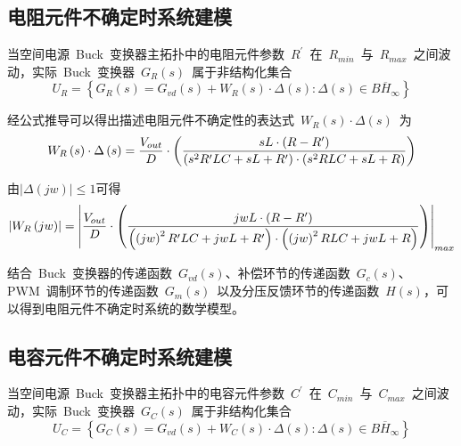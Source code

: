 \subsection{电阻元件不确定时系统建模}
\label{sub:chap5:R_uncertainty}

当空间电源~Buck~变换器主拓扑中的电阻元件参数~$R^{\prime}$~在~$R_{min}$~与~$R_{max}$~之间波动，实际~Buck~变换器~$G_R\left(s\right)$~属于非结构化集合
\begin{equation}\label{equ:chap5:Index11}
 U_{R}=\left\{G_{R}\left(s\right)=G_{vd}\left(s\right)+W_{R}\left(s\right)\cdot \Delta\left(s\right):\Delta\left(s\right) \in  \overline{BH_{\infty}}\right\}
\end{equation}

经公式推导可以得出描述电阻元件不确定性的表达式~$W_{R}\left(s\right)\cdot\Delta\left(s\right)$~为
\begin{equation}\label{equ:chap5:Index12}
W_{R}\left(s\right)\cdot\Delta\left(s\right)=\displaystyle\frac{V_{out}}{D}\cdot\left(\displaystyle\frac{sL\cdot\left(R-R^{\prime}\right)}{\left(s^2R^{\prime}LC+sL+R^{\prime}\right)\cdot\left(s^2RLC+sL+R\right)}\right)
\end{equation}

由$\left|\Delta\left(jw\right)\right|\leqslant 1$可得
\begin{equation}\label{equ:chap5:Index13}
\left|W_R\left(jw\right) \right|=\left|  \displaystyle\frac{V_{out}}{D}\cdot\left(\displaystyle\frac{jwL\cdot\left(R-R^{\prime}\right)}{\left(\left(jw\right)^2R^{\prime}LC+jwL+R^{\prime}\right)\cdot\left(\left(jw\right)^2RLC+jwL+R\right)}\right)
 \right|_{max}
\end{equation}

结合~Buck~变换器的传递函数~$G_{vd}\left(s\right)$、补偿环节的传递函数~$G_{c}\left(s\right)$、PWM~调制环节的传递函数~$G_{m}\left(s\right)$~以及分压反馈环节的传递函数~$H\left(s\right)$，可以得到电阻元件不确定时系统的数学模型。

\subsection{电容元件不确定时系统建模}
\label{sub:chap5:C_uncertainty}

当空间电源~Buck~变换器主拓扑中的电容元件参数~$C^{\prime}$~在~$C_{min}$~与~$C_{max}$~之间波动，实际~Buck~变换器~$G_C\left(s\right)$~属于非结构化集合
\begin{equation}\label{equ:chap5:Index14}
 U_{C}=\left\{G_{C}\left(s\right)=G_{vd}\left(s\right)+W_{C}\left(s\right)\cdot \Delta\left(s\right):\Delta\left(s\right) \in  \overline{BH_{\infty}}\right\}
\end{equation}

